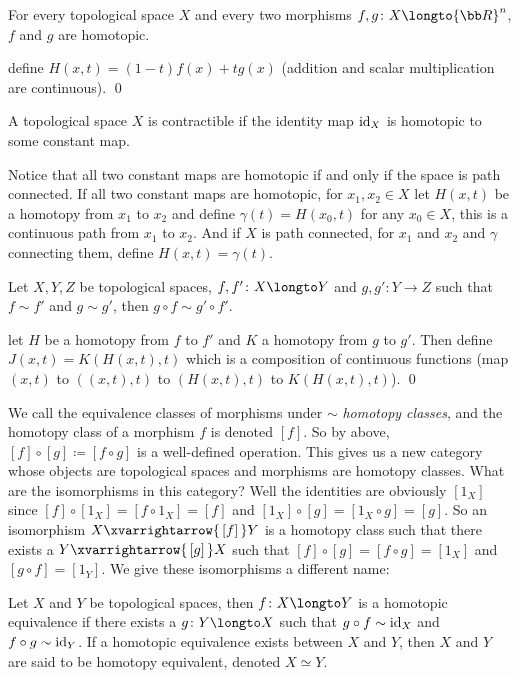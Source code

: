 \bprop

    For every topological space $X$ and every two morphisms $f,g\colon X\longto{\bb R}^n$, $f$ and $g$ are homotopic.

\eprop

\Proof define $H(x,t)=(1-t)f(x)+tg(x)$ (addition and scalar multiplication are continuous).
\qed

\bdefn

    A topological space $X$ is {\emphcolor contractible} if the identity map ${\rm id}_X$ is homotopic to some constant map.

\edefn

Notice that all two constant maps are homotopic if and only if the space is path connected.
If all two constant maps are homotopic, for $x_1,x_2\in X$ let $H(x,t)$ be a homotopy from $x_1$ to $x_2$ and define $\gamma(t)=H(x_0,t)$ for any $x_0\in X$, this is a continuous path from $x_1$ to $x_2$.
And if $X$ is path connected, for $x_1$ and $x_2$ and $\gamma$ connecting them, define $H(x,t)=\gamma(t)$.

\bprop

    Let $X,Y,Z$ be topological spaces, $f,f'\colon X\longto Y$ and $g,g'\colon Y\to Z$ such that $f\sim f'$ and $g\sim g'$, then $g\circ f\sim g'\circ f'$.

\eprop

\Proof let $H$ be a homotopy from $f$ to $f'$ and $K$ a homotopy from $g$ to $g'$.
Then define $J(x,t)=K(H(x,t),t)$ which is a composition of continuous functions (map $(x,t)$ to $((x,t),t)$ to $(H(x,t),t)$ to $K(H(x,t),t)$).
\qed

We call the equivalence classes of morphisms under $\sim$ {\it homotopy classes}, and the homotopy class of a morphism $f$ is denoted $[f]$.
So by above, $[f]\circ[g]\coloneqq[f\circ g]$ is a well-defined operation.
This gives us a new category whose objects are topological spaces and morphisms are homotopy classes.
What are the isomorphisms in this category?
Well the identities are obviously $[1_X]$ since $[f]\circ[1_X]=[f\circ1_X]=[f]$ and $[1_X]\circ[g]=[1_X\circ g]=[g]$.
So an isomorphism $X\xvarrightarrow{\,[f]\,}Y$ is a homotopy class such that there exists a $Y\xvarrightarrow{\,[g]\,}X$ such that $[f]\circ[g]=[f\circ g]=[1_X]$ and $[g\circ f]=[1_Y]$.
We give these isomorphisms a different name:

\bdefn

    Let $X$ and $Y$ be topological spaces, then $f\colon X\longto Y$ is a {\emphcolor homotopic equivalence} if there exists a $g\colon Y\longto X$ such that $g\circ f\sim{\rm id}_X$ and
    $f\circ g\sim{\rm id}_Y$.
    If a homotopic equivalence exists between $X$ and $Y$, then $X$ and $Y$ are said to be {\emphcolor homotopy equivalent}, denoted $X\simeq Y$.

